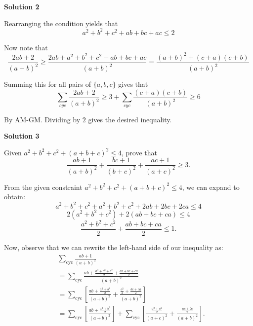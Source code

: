 \begin{enumerate}
 



\textbf{Solution 2}

Rearranging the condition yields that
 \[a^2 + b^2 + c^2 +ab+bc+ac \le 2\]

 Now note that
 \[\frac{2ab+2}{(a+b)^2} \ge \frac{2ab+a^2 + b^2 + c^2 +ab+bc+ac}{(a+b)^2}=\frac{(a+b)^2 + (c+a)(c+b)}{(a+b)^2}\]

 Summing this for all pairs of $\{ a,b,c \}$ gives that
 \[\sum_{cyc} \frac{2ab+2}{(a+b)^2} \ge 3+ \sum_{cyc}\frac{(c+a)(c+b)}{(a+b)^2} \ge 6\]

 By AM-GM. Dividing by $2$ gives the desired inequality.

 



\textbf{Solution 3}

Given $a^2+b^2+c^2+(a+b+c)^2 \leq 4$, prove that
 \[\frac{ab+1}{(a+b)^2}+\frac{bc+1}{(b+c)^2}+\frac{ac+1}{(a+c)^2} \geq 3.\]

 From the given constraint $a^2+b^2+c^2+(a+b+c)^2 \leq 4$, we can expand to obtain:
 \[a^2+b^2+c^2+a^2+b^2+c^2+2ab+2bc+2ca \leq 4\]
 \[2(a^2+b^2+c^2)+2(ab+bc+ca) \leq 4\]
 \[\frac{a^2+b^2+c^2}{2}+\frac{ab+bc+ca}{2} \leq 1.\]

 Now, observe that we can rewrite the left-hand side of our inequality as:\begin{align*}&\sum_{\text{cyc}} \frac{ab+1}{(a+b)^2} \\&= \sum_{\text{cyc}} \frac{ab+\frac{a^2+b^2+c^2}{2}+\frac{ab+bc+ca}{2}}{(a+b)^2} \\&= \sum_{\text{cyc}} \left[\frac{ab+\frac{a^2+b^2}{2}}{(a+b)^2} + \frac{\frac{c^2}{2}+\frac{bc+ca}{2}}{(a+b)^2}\right] \\&= \sum_{\text{cyc}} \left[\frac{ab+\frac{a^2+b^2}{2}}{(a+b)^2}\right] + \sum_{\text{cyc}} \left[\frac{\frac{a^2+c^2}{2}}{(a+c)^2} + \frac{\frac{ac+bc}{2}}{(a+b)^2}\right].\end{align*}



\end{enumerate}
